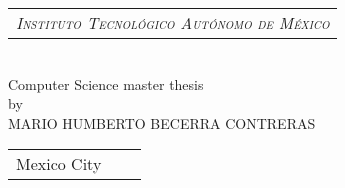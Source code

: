 
\thispagestyle{empty}
\begin{titlepage}

	\begin{center}
	\vspace{150pt}
		\begin{tabular}{c}
			\Large \emph{\textsc{Instituto Tecnológico Autónomo de México}}\\
		\end{tabular}\\
		\vspace{100pt}
		{\Large Computer Science master thesis} \\
		\vspace{45 pt}
		{\Large by} \\
		\vspace{45 pt}
		{\Large MARIO HUMBERTO BECERRA CONTRERAS} \\
		\vspace{200 pt}
		\begin{tabular}{lcr}
			Mexico City & \hspace{60pt} & \theyear
		\end{tabular}
	\end{center}
\end{titlepage}
